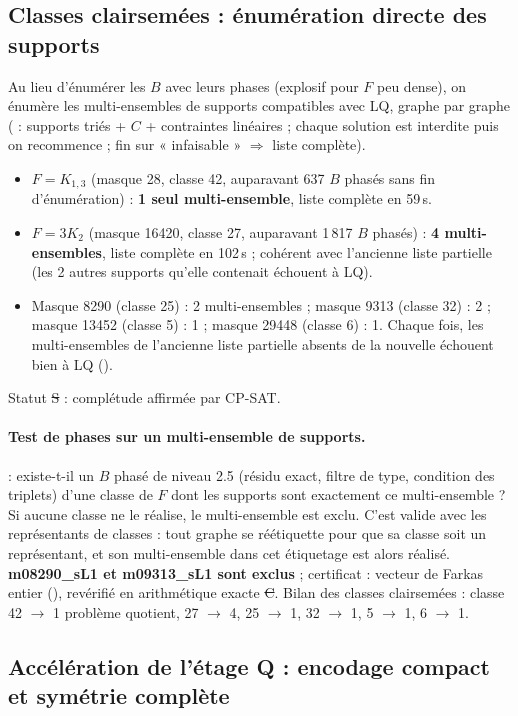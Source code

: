 \subsection{Classes clairsemées : énumération directe des supports}
Au lieu d'énumérer les $B$ avec leurs phases (explosif pour $F$ peu dense), on énumère les multi-ensembles de supports compatibles avec LQ, graphe par graphe
( : supports triés + $C$ + contraintes linéaires ; chaque solution est interdite puis on recommence ; fin sur « infaisable »
$\Rightarrow$ liste complète).
\begin{itemize}[nosep]
\item $F=K_{1,3}$ (masque 28, classe 42, auparavant 637 $B$ phasés sans fin d'énumération) : \textbf{1 seul multi-ensemble}, liste complète en 59\,s.
\item $F=3K_2$ (masque 16420, classe 27, auparavant 1\,817 $B$ phasés) : \textbf{4 multi-ensembles}, liste complète en 102\,s ; cohérent avec l'ancienne
liste partielle (les 2 autres supports qu'elle contenait échouent à LQ).
\item Masque 8290 (classe 25) : 2 multi-ensembles ; masque 9313 (classe 32) : 2 ; masque 13452 (classe 5) : 1 ; masque 29448 (classe 6) : 1.
Chaque fois, les multi-ensembles de l'ancienne liste partielle absents de la nouvelle échouent bien à LQ ().
\end{itemize}
Statut \st{S} : complétude affirmée par CP-SAT.

\paragraph{Test de phases sur un multi-ensemble de supports.}  : existe-t-il un $B$ phasé de niveau 2.5 (résidu exact,
filtre de type, condition des triplets) d'une classe de $F$ dont les supports sont exactement ce multi-ensemble ? Si aucune classe ne le réalise,
le multi-ensemble est exclu. C'est valide avec les représentants de classes : tout graphe se réétiquette pour que sa classe soit un représentant, et son
multi-ensemble dans cet étiquetage est alors réalisé. \textbf{m08290\_sL1 et m09313\_sL1 sont exclus} ; certificat : vecteur de Farkas entier
(), revérifié en arithmétique exacte \st{C}. Bilan des classes clairsemées : classe 42 $\to$ 1 problème quotient, 27 $\to$ 4,
25 $\to$ 1, 32 $\to$ 1, 5 $\to$ 1, 6 $\to$ 1.

\subsection{Accélération de l'étage Q : encodage compact et symétrie complète}
